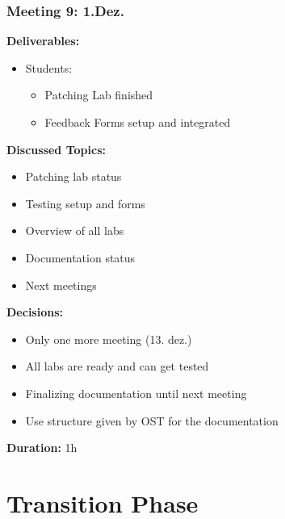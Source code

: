 \subsubsection*{Meeting 9: 1.Dez.}
\textbf{Deliverables:}
\begin{itemize}
    \item Students:
    \begin{itemize}
        \item Patching Lab finished 
        \item Feedback Forms setup and integrated
    \end{itemize}
\end{itemize} 
\textbf{Discussed Topics:}
\begin{itemize}
    \item Patching lab status 
    \item Testing setup and forms
    \item Overview of all labs
    \item Documentation status
    \item Next meetings
\end{itemize}
\textbf{Decisions:}
\begin{itemize}
    \item Only one more meeting (13. dez.)
    \item All labs are ready and can get tested
    \item Finalizing documentation until next meeting
    \item Use structure given by OST for the documentation
\end{itemize}
\textbf{Duration:} 1h

\newpage
\section*{Transition Phase}
